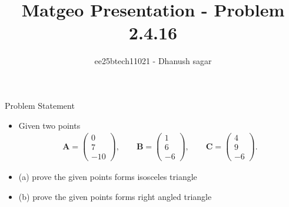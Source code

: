 \documentclass{beamer}
\title{Matgeo Presentation - Problem 2.4.16}
\author{ee25btech11021 - Dhanush sagar}
\numberwithin{equation}{section}
\theoremstyle{remark}
\newcommand{\myvec}[1]{\ensuremath{\begin{pmatrix}#1\end{pmatrix}}}
\let\vec\mathbf
\begin{document}
	

		




\begin{frame}
  \titlepage
\end{frame}

\begin{frame}{Problem Statement}
  \begin{itemize}
    \item Given two points
    \begin{align*}
    \vec{A} = \myvec{0\\7\\-10}, \qquad
\vec{B} = \myvec{1\\6\\-6}, \qquad
\vec{C} = \myvec{4\\9\\-6}.
    \end{align*}
    \item(a) prove the given points forms isosceles triangle
    \item (b) prove the given points forms right angled triangle
   
  \end{itemize}
\end{frame}
\end{document}
